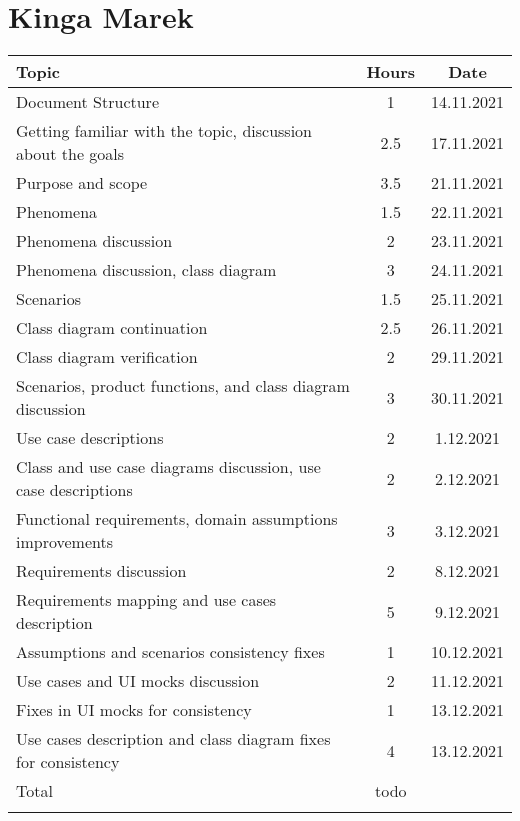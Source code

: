 \section*{Kinga Marek}
\begin{table}[H]
    \centering
    \begin{tabular}{lcc} \Xhline{1.5pt}
        Topic &  Hours & Date \\ \hline
        Document Structure & 1 & 14.11.2021 \\ 
        Getting familiar with the topic, discussion about the goals & 2.5 & 17.11.2021 \\ 
        Purpose and scope & 3.5 & 21.11.2021 \\
        Phenomena & 1.5 & 22.11.2021 \\ 
        Phenomena discussion & 2 & 23.11.2021 \\
        Phenomena discussion, class diagram & 3 & 24.11.2021 \\ 
        Scenarios & 1.5 & 25.11.2021 \\ 
        Class diagram continuation & 2.5 & 26.11.2021 \\
        Class diagram verification & 2 & 29.11.2021 \\
        Scenarios, product functions, and class diagram discussion & 3 & 30.11.2021\\ 
        Use case descriptions & 2 & 1.12.2021\\
        Class and use case diagrams discussion, use case descriptions & 2 & 2.12.2021\\
        Functional requirements, domain assumptions improvements & 3 & 3.12.2021\\
        Requirements discussion & 2 & 8.12.2021\\
        Requirements mapping and use cases description & 5 & 9.12.2021\\
        Assumptions and scenarios consistency fixes & 1 & 10.12.2021\\
        Use cases and UI mocks discussion & 2 & 11.12.2021\\
        Fixes in UI mocks for consistency & 1 & 13.12.2021\\
        Use cases description and class diagram fixes for consistency & 4 & 13.12.2021\\
        \hline
        Total & todo & \\ \Xhline{1.5pt}
    \end{tabular}
\end{table}